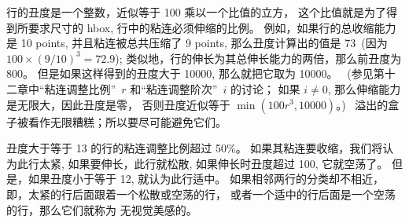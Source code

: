 \ddanger 行的丑度是一个整数，近似等于 100 乘以一个比值的立方，
这个比值就是为了得到所要求尺寸的 hbox, 行中的粘连必须伸缩的比例。%
例如，如果行的总收缩能力是 10 points, 并且粘连被总共压缩了 9 points,
那么丑度计算出的值是 73~(因为 $100\times(9/10)^3=72.9$);
类似地，行的伸长为其总伸长能力的两倍，那么前丑度为 800。%
但是如果这样得到的丑度大于 10000, 那么就把它取为 10000。%
~(参见第十二章中``粘连调整比例''~$r$ 和``粘连调整阶次''~$i$ 的讨论；
如果 $i\ne0$, 那么伸缩能力是无限大，因此丑度是零，
否则丑度近似等于 $\min(100r^3,10000)$。)~%
溢出的盒子被看作无限糟糕；所以要尽可能避免它们。

\ddanger 丑度大于等于 13 的行的粘连调整比例超过 50\%。%
如果其粘连要收缩，我们将认为此行{太紧},
如果要伸长，此行就{松散},
如果伸长时丑度超过 100, 它就{空荡}了。%
但是，如果丑度小于等于 12, 就认为此行{适中}。%
如果相邻两行的分类却不相近，即，太紧的行后面跟着一个松散或空荡的\hbox{行，}
或者一个适中的行后面是一个空荡的行，那么它们就称为%
{无视觉美感的}。

